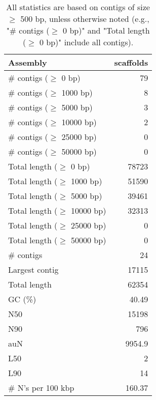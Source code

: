 \documentclass[12pt,a4paper]{article}
\begin{document}
\begin{table}[ht]
\begin{center}
\caption{All statistics are based on contigs of size $\geq$ 500 bp, unless otherwise noted (e.g., "\# contigs ($\geq$ 0 bp)" and "Total length ($\geq$ 0 bp)" include all contigs).}
\begin{tabular}{|l*{1}{|r}|}
\hline
Assembly & scaffolds \\ \hline
\# contigs ($\geq$ 0 bp) & 79 \\ \hline
\# contigs ($\geq$ 1000 bp) & 8 \\ \hline
\# contigs ($\geq$ 5000 bp) & 3 \\ \hline
\# contigs ($\geq$ 10000 bp) & 2 \\ \hline
\# contigs ($\geq$ 25000 bp) & 0 \\ \hline
\# contigs ($\geq$ 50000 bp) & 0 \\ \hline
Total length ($\geq$ 0 bp) & 78723 \\ \hline
Total length ($\geq$ 1000 bp) & 51590 \\ \hline
Total length ($\geq$ 5000 bp) & 39461 \\ \hline
Total length ($\geq$ 10000 bp) & 32313 \\ \hline
Total length ($\geq$ 25000 bp) & 0 \\ \hline
Total length ($\geq$ 50000 bp) & 0 \\ \hline
\# contigs & 24 \\ \hline
Largest contig & 17115 \\ \hline
Total length & 62354 \\ \hline
GC (\%) & 40.49 \\ \hline
N50 & 15198 \\ \hline
N90 & 796 \\ \hline
auN & 9954.9 \\ \hline
L50 & 2 \\ \hline
L90 & 14 \\ \hline
\# N's per 100 kbp & 160.37 \\ \hline
\end{tabular}
\end{center}
\end{table}
\end{document}
